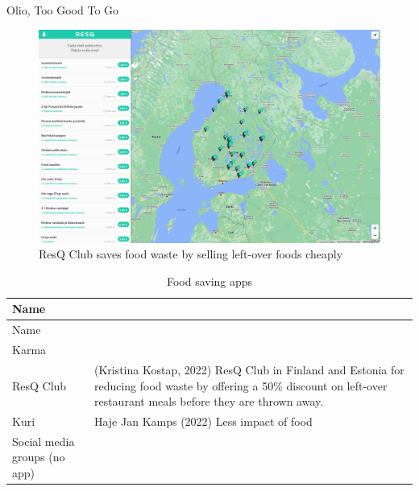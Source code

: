 \documentclass[
  letterpaper,
  DIV=11,
  numbers=noendperiod]{scrartcl}
\begin{document}
Olio, Too Good To Go

\begin{figure}[H]

{\centering \includegraphics[width=1\linewidth,height=\textheight,keepaspectratio]{./images/design/resq-club.png}

}

\caption{ResQ Club saves food waste by selling left-over foods cheaply}

\end{figure}%

\begin{longtable}[]{@{}
  >{\raggedright\arraybackslash}p{}
  >{\raggedright\arraybackslash}p{}@{}}
\caption{Food saving apps}\tabularnewline
\toprule\noalign{}
\begin{minipage}[b]{\linewidth}\raggedright
Name
\end{minipage} & \begin{minipage}[b]{\linewidth}\raggedright
\end{minipage} \\
\midrule\noalign{}
\endfirsthead
\toprule\noalign{}
\begin{minipage}[b]{\linewidth}\raggedright
Name
\end{minipage} & \begin{minipage}[b]{\linewidth}\raggedright
\end{minipage} \\
\midrule\noalign{}
\endhead
\bottomrule\noalign{}
\endlastfoot
Karma & \\
ResQ Club & (Kristina Kostap, 2022) ResQ Club in Finland and Estonia for
reducing food waste by offering a 50\% discount on left-over restaurant
meals before they are thrown away. \\
Kuri & Haje Jan Kamps (2022) Less impact of food \\
Social media groups (no app) & \\
\end{longtable}
\end{document}
